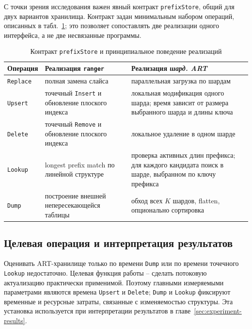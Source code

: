 С точки зрения исследования важен явный контракт \texttt{prefixStore},
общий для двух вариантов хранилища. Контракт задан минимальным набором
операций, описанных в табл.~\ref{tab:store-contract}; это позволяет
сопоставлять две реализации одного интерфейса, а не две несвязанные
программы.

\begin{table}[ht]
\centering
\caption{Контракт \texttt{prefixStore} и принципиальное поведение реализаций}
\label{tab:store-contract}
\small
\begin{tabular}{>{\raggedright\arraybackslash}p{2.6cm}>{\raggedright\arraybackslash}p{4.6cm}>{\raggedright\arraybackslash}p{5.6cm}}
\toprule
Операция & Реализация \texttt{ranger} & Реализация \textit{шард. ART} \\
\midrule
\texttt{Replace} & полная замена слайса
                 & параллельная загрузка по шардам \\
\texttt{Upsert}  & точечный \texttt{Insert} и обновление плоского индекса
                 & локальная модификация одного шарда; время зависит от размера выбранного шарда и длины ключа \\
\texttt{Delete}  & точечный \texttt{Remove} и обновление плоского индекса
                 & локальное удаление в одном шарде \\
\texttt{Lookup}  & longest prefix match по линейной структуре
                 & проверка активных длин префикса; для каждого кандидата поиск в шарде, выбранном по ключу префикса \\
\texttt{Dump}    & построение внешней непересекающейся таблицы
                 & обход всех $K$ шардов, flatten, опционально сортировка \\
\bottomrule
\end{tabular}
\end{table}

\subsection{Целевая операция и интерпретация результатов}

Оценивать ART-хранилище только по времени \texttt{Dump} или по времени
точечного \texttt{Lookup} недостаточно. Целевая функция работы -- сделать
потоковую актуализацию практически применимой. Поэтому главными
измеряемыми параметрами являются времена \texttt{Upsert} и
\texttt{Delete}; \texttt{Dump} и \texttt{Lookup} фиксируют временные и
ресурсные затраты, связанные с изменяемостью структуры. Эта установка
используется при интерпретации результатов в
главе~\ref{sec:experiment-results}.

